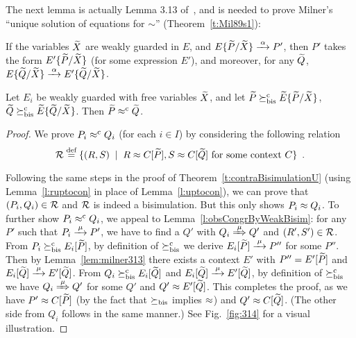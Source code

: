 The next lemma is actually Lemma 3.13 of~\citep[p.~102]{Mil89}, and
is needed to prove Milner's ``unique solution of equations for
$\sim$'' (Theorem~\ref{t:Mil89s1}):
\begin{lemma}
  \label{lem:milner313}
  If the variables ${\widetilde X}$ are weakly guarded in $E$, and $E\{\til
  P/\til X\} \arr{\alpha} P'$, then $P'$ takes the form $E'\{\widetilde
  P/\widetilde X\}$ (for some expression $E'$), and moreover, for any ${\widetilde Q}$,
  $E\{\til Q/\til X\} \arr{\alpha} E'\{\til Q/\til X\}$.
\end{lemma}

\begin{theorem}
\label{t:rcontraBisimulationU}
Let $E_i$ be weakly guarded with free variables  $\widetilde X$,
and let $\widetilde P \mathrel{\succeq^{\rm{c}}_{\rm{bis}}} \widetilde E\{\widetilde P/\widetilde X\}$,
    $\widetilde Q \mathrel{\succeq^{\rm{c}}_{\rm{bis}}} \widetilde E\{\widetilde Q/\widetilde X\}$. Then $\widetilde P \mathrel{\approx^{\rm{c}}} \widetilde Q$.
\end{theorem}

\begin{proof}
We  prove $P_i \mathrel{\approx^{\rm{c}}} Q_i$ (for each $i \in I$) by considering
the following relation
\begin{equation*}
{\cal R} \stackrel{\mbox{\scriptsize def}}{=} \{(R,S) \; \mid \; R \approx C [\widetilde P], S \approx C [\widetilde Q] \mbox{~for some context
$C$} \} \enspace.
\end{equation*}

Following the same steps in the proof of
Theorem~\ref{t:contraBisimulationU}
(using Lemma~\ref{l:ruptocon}
in place of Lemma~\ref{l:uptocon}), we can prove that $(P_i, Q_i)
\in{\cal R}$ and ${\cal R}$ is indeed a bisimulation. But this only shows $P_i \approx Q_i$.
%
To further show $P_i \mathrel{\approx^{\rm{c}}} Q_i$, we appeal to
Lemma~\ref{l:obsCongrByWeakBisim}: for any $P'$ such that $P_i \arr{\mu} P'$, we have to
  find a $Q'$ with $Q_i \Arr{\mu} Q'$ and $(R',S') \in {\cal R}$.
%
From $P_i \mathrel{\succeq^{\rm{c}}_{\rm{bis}}} E_i[{\widetilde P}]$, by definition of $\mathrel{\succeq^{\rm{c}}_{\rm{bis}}}$ we derive $E_i[{\til P}] \arr{\mu}
P''$ for some $P''$. Then by Lemma~\ref{lem:milner313} there exists a context
$E'$ with $P'' = E'[{\widetilde P}]$ and $E_i[{\til Q}] \arr{\mu} E'[{\til Q}]$.
%
From $Q_i \mathrel{\succeq^{\rm{c}}_{\rm{bis}}} E_i[{\widetilde Q}]$ and $E_i[{\til Q}] \arr{\mu} E'[{\til
  Q}]$, by definition of $\mathrel{\succeq^{\rm{c}}_{\rm{bis}}}$ we have $Q_i \Arr{\mu} Q'$ for some
$Q'$ and $Q' \approx E'[{\widetilde Q}]$. This completes the proof, as we have
$P' \approx C[{\widetilde P}]$ (by the fact that $\mathrel{\succeq_{\rm{bis}}}$ implies $\approx$) and
$Q' \approx C[{\widetilde Q}]$. (The other side from $Q_i$ follows in the same manner.)
See Fig.~\ref{fig:314} for a visual illustration.
\end{proof}

